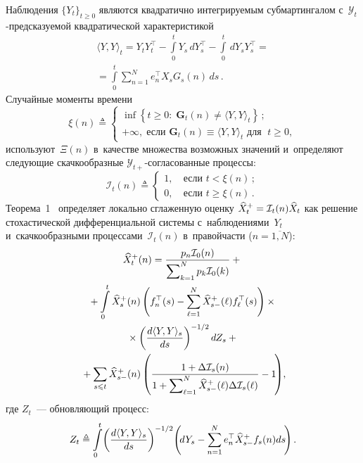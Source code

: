 \begin{multicols}{2}
   Наблюдения $\{Y_t\}_{t \geqslant 0}$ являются квадратично интегрируемым 
   субмартингалом с~$\mathcal{Y}_t$-пред\-ска\-зу\-емой квадратической характеристикой
  \begin{multline*}
  \langle Y,Y\rangle_t =
  Y_t Y_t^{\top}- \int\limits_0^t Y_s \,dY_s^{\top} - \int\limits_0^t \,dY_s Y_s^{\top}
  ={}\\
  {}=
  \int\limits_0^t \sum\limits_{n=1}^Ne_n^{\top}X_s G_s(n)\,ds\,.
  \end{multline*}
  Случайные моменты времени
  \begin{equation*}
  \xi(n) \triangleq  \left\{
  \begin{array}{l}
  \displaystyle
  \inf \left\{ t\geqslant 0: \; \mathbf{G}_t(n) \neq \langle Y,Y\rangle_t \right\}\,; \\[6pt]
  +\infty, \; \mbox{если $\displaystyle \mathbf{G}_t(n) \equiv \langle Y,Y\rangle_t$ для $\; t\geqslant 0 $},
  \end{array}
  \right.
  \end{equation*}
  используют~$\Xi(n)$ в~качестве множества возможных значений и~определяют 
  следующие скачкообразные $\mathcal{Y}_{t+}$-со\-гла\-со\-ван\-ные процессы:
    \begin{equation*}
  \mathcal{I}_t(n)
   \triangleq \begin{cases}
   1, &\ \mbox{если } t < \xi(n)\,;\\
   0, &\ \mbox{если } t \geqslant \xi(n)\,.
\end{cases}
  \end{equation*}
Теорема~1~\cite{B_17} определяет локально сглаженную оценку $\widehat{X}^+_t
\hm=\mathcal{I}_t(n)\widehat{X}_t$ как решение стохастической дифференциальной 
системы с~наблюде\-ниями~$Y_t$ и~скачкообразными процессами~$\mathcal{I}_t(n)$ 
в~правой\linebreak \mbox{части} ($n=\overline{1,N}$):
  \begin{multline}
  \widehat{X}_t^+(n) = \displaystyle\frac{\displaystyle p_n\mathcal{I}_{0}(n)\mathstrut}{\displaystyle \sum\nolimits_{k=1}^N p_k\mathcal{I}_{0}(k)\mathstrut} +{}\\
  {}+
  \int\limits_0^t \widehat{X}_{s}^+(n)\left(
  f_n^{\top}(s) - \sum\limits_{\ell=1}^N \widehat{X}_{s-}^+(\ell)f_{\ell}^{\top}(s)
  \right)\times{}\\
  {}\times \left( \displaystyle\frac{\displaystyle d\langle Y,Y\rangle_s\mathstrut}{\displaystyle ds\mathstrut}\right)^{-1/2}dZ_s+{} \\
\!{}  + \sum\limits_{s \leqslant t} \widehat{X}^+_{s-}(n)
  \left(
  \displaystyle\frac{\displaystyle 1+\Delta\mathcal{I}_{s}(n)\mathstrut}{\displaystyle 1+\sum\nolimits_{\ell=1}^N \widehat{X}_{s-}^+(\ell)\Delta\mathcal{I}_{s}(\ell)\mathstrut} 
  - 1  \! \right)\!,\!\!
  \label{eq:dif_class_norm}
  \end{multline}
  где $Z_t$~--- обновляющий процесс:
  \begin{equation*}
Z_t \triangleq \int\limits_0^t \! \left(\displaystyle\frac{\displaystyle d\langle Y,Y\rangle_s\mathstrut}{\displaystyle ds\mathstrut}\right)^{-1/2}\!
\left( \!dY_s - \sum\limits_{n=1}^Ne_n^{\top}\widehat{X}_{s-}^+ f_s(n)ds \!\right).
\end{equation*}


\end{multicols}
